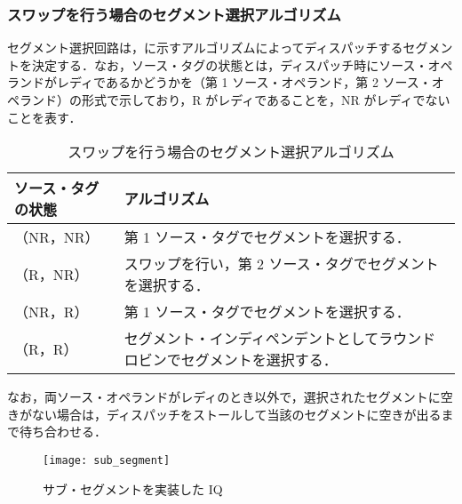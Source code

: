 \subsubsection{スワップを行う場合のセグメント選択アルゴリズム}
セグメント選択回路は，に示すアルゴリズムによってディスパッチするセグメントを決定する．なお，ソース・タグの状態とは，ディスパッチ時にソース・オペランドがレディであるかどうかを（第 1 ソース・オペランド，第 2 ソース・オペランド）の形式で示しており，R がレディであることを，NR がレディでないことを表す．

\begin{table}[htb]
  \caption{スワップを行う場合のセグメント選択アルゴリズム}
  \footnotesize
  \center
   \begin{tabular}{|l|l|} \hline \hline
    ソース・タグの状態 & アルゴリズム \\ \hline
    （NR，NR） & 第 1 ソース・タグでセグメントを選択する． \\ \hline
    （R，NR） & スワップを行い，第 2 ソース・タグでセグメントを選択する．\\ \hline
    （NR，R） & 第 1 ソース・タグでセグメントを選択する．\\ \hline
    （R，R） & セグメント・インディペンデントとしてラウンドロビンでセグメントを選択する． \\ \hline
  \end{tabular}
  \label{tab:agg_algorithm}
\end{table}
なお，両ソース・オペランドがレディのとき以外で，選択されたセグメントに空きがない場合は，ディスパッチをストールして当該のセグメントに空きが出るまで待ち合わせる．


\begin{figure}[htb]
  \centering
  \texttt{[image: sub\_segment]}
  \caption{サブ・セグメントを実装した IQ}
  \label{fig:sub_segment}
\end{figure}

